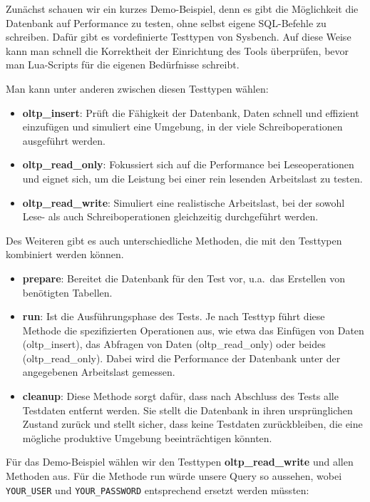Zunächst schauen wir ein kurzes Demo-Beispiel, denn es gibt die Möglichkeit die Datenbank
auf Performance zu testen, ohne selbst eigene SQL-Befehle zu schreiben.
Dafür gibt es vordefinierte Testtypen von Sysbench.
Auf diese Weise kann man schnell die Korrektheit der Einrichtung des Tools überprüfen, bevor man Lua-Scripts
für die eigenen Bedürfnisse schreibt.

Man kann unter anderen zwischen diesen Testtypen wählen:
\begin{itemize}
    \item \textbf{oltp\_insert}: Prüft die Fähigkeit der Datenbank, Daten schnell und effizient einzufügen und
    simuliert eine Umgebung, in der viele Schreiboperationen ausgeführt werden.
    \item \textbf{oltp\_read\_only}: Fokussiert sich auf die Performance bei Leseoperationen und
    eignet sich, um die Leistung bei einer rein lesenden Arbeitslast zu testen.
    \item \textbf{oltp\_read\_write}: Simuliert eine realistische Arbeitslast, bei der sowohl Lese- als
    auch Schreiboperationen gleichzeitig durchgeführt werden.
\end{itemize}

Des Weiteren gibt es auch unterschiedliche Methoden, die mit den Testtypen kombiniert werden können.

\begin{itemize}
    \item \textbf{prepare}: Bereitet die Datenbank für den Test vor, u.a.\ das Erstellen von benötigten Tabellen.
    \item \textbf{run}: Ist die Ausführungsphase des Tests.
    Je nach Testtyp führt diese Methode die spezifizierten Operationen aus, wie etwa das Einfügen von Daten (oltp\_insert), das Abfragen von Daten (oltp\_read\_only) oder beides (oltp\_read\_only).
    Dabei wird die Performance der Datenbank unter der angegebenen Arbeitslast gemessen.
    \item \textbf{cleanup}: Diese Methode sorgt dafür, dass nach Abschluss des Tests alle Testdaten entfernt werden.
    Sie stellt die Datenbank in ihren ursprünglichen Zustand zurück und stellt sicher,
    dass keine Testdaten zurückbleiben, die eine mögliche produktive Umgebung beeinträchtigen könnten.
\end{itemize}

Für das Demo-Beispiel wählen wir den Testtypen \textbf{oltp\_read\_write} und allen Methoden aus.
Für die Methode run würde unsere Query so aussehen, wobei \texttt{YOUR\_USER} und \texttt{YOUR\_PASSWORD}
entsprechend ersetzt werden müssten:


